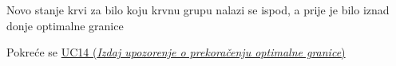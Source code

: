 \begin{packed_item}
\begin{packed_item}
							\item[4] Novo stanje krvi za bilo koju krvnu grupu nalazi se ispod, a prije je bilo iznad donje optimalne granice 
                            \item[] \begin{packed_enum} 
                                \item Pokreće se \hyperref[UC14]{UC14 (\textit{Izdaj upozorenje o prekoračenju optimalne granice})}
							\end{packed_enum}

						\end{packed_item}
						
					\end{packed_item}
					
					
					\noindent {}
